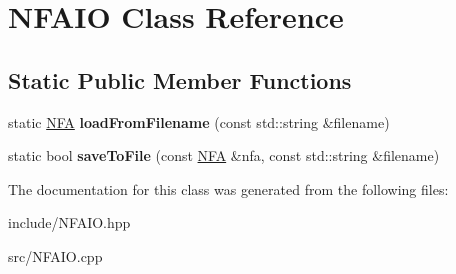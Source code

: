 \hypertarget{classNFAIO}{}\section{N\+F\+A\+IO Class Reference}
\label{classNFAIO}
\subsection*{Static Public Member Functions}
\begin{DoxyCompactItemize}
\item 
static \hyperlink{classNFA}{N\+FA} {\bfseries load\+From\+Filename} (const std\+::string \&filename)\hypertarget{classNFAIO_a06e1cedc984bdd40daef8e3d5fd2f54d}{}\label{classNFAIO_a06e1cedc984bdd40daef8e3d5fd2f54d}

\item 
static bool {\bfseries save\+To\+File} (const \hyperlink{classNFA}{N\+FA} \&nfa, const std\+::string \&filename)\hypertarget{classNFAIO_a17b2b008419263c873e3c46ffaaf7902}{}\label{classNFAIO_a17b2b008419263c873e3c46ffaaf7902}

\end{DoxyCompactItemize}


The documentation for this class was generated from the following files\+:\begin{DoxyCompactItemize}
\item 
include/N\+F\+A\+I\+O.\+hpp\item 
src/N\+F\+A\+I\+O.\+cpp\end{DoxyCompactItemize}
